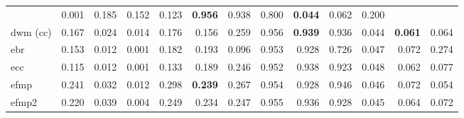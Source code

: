 \begin{tabular}{l:rrr:rrr:rrr:rrr}
	                                                       & 0.001          & 0.185          & 0.152          & 0.123 &
	\textbf{0.956}                                         & 0.938          & 0.800          & \textbf{0.044} & 0.062 & 0.200                                                         \\
	\acrshort{dwm} (\acrshort{cc})                         & 0.167          & 0.024
	                                                       & 0.014          & 0.176          & 0.156          & 0.259 & 0.956
	                                                       & \textbf{0.939} & 0.936          & 0.044
	                                                       & \textbf{0.061} & 0.064                                                                                                   \\
	\acrshort{ebr}                                         & 0.153          & 0.012          & 0.001          & 0.182 & 0.193 & 0.096 & 0.953 & 0.928 & 0.726 & 0.047 & 0.072 & 0.274 \\
	\acrshort{ecc}                                         & 0.115          & 0.012          & 0.001          & 0.133 & 0.189 & 0.246 & 0.952 & 0.938 & 0.923 & 0.048 & 0.062 & 0.077 \\
	\hline
	\acrshort{efmp}                                        & 0.241          &
	0.032                                                  & 0.012          & 0.298          & \textbf{0.239} & 0.267 & 0.954 & 0.928 & 0.946 & 0.046 & 0.072 & 0.054                 \\
	\acrshort{efmp2}                                       & 0.220          & 0.039          & 0.004          & 0.249 & 0.234 & 0.247 & 0.955 & 0.936 & 0.928 & 0.045 & 0.064 & 0.072 \\
	\bottomrule
\end{tabular}
